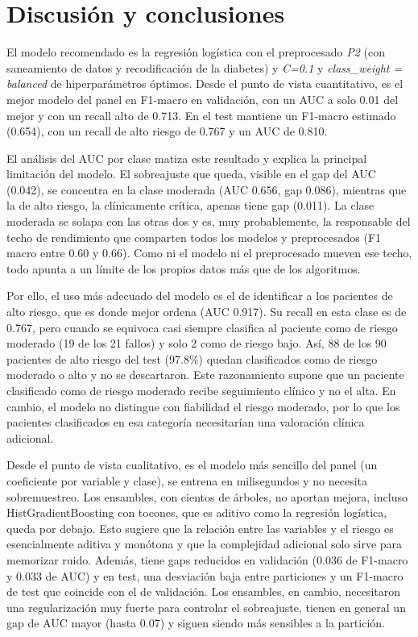 \documentclass[journal,onecolumn]{IEEEtran}
\begin{document}
\section{Discusión y conclusiones}

El modelo recomendado es la regresión logística con el preprocesado \textit{P2} (con saneamiento de datos y recodificación de la diabetes) y \textit{C=0.1} y \textit{class\_weight = balanced} de hiperparámetros óptimos. Desde el punto de vista cuantitativo, es el mejor modelo del panel en F1-macro en validación, con un AUC a solo 0.01 del mejor y con un recall alto de 0.713. En el test mantiene un F1-macro estimado (0.654), con un recall de alto riesgo de 0.767 y un AUC de 0.810.

El análisis del AUC por clase matiza este resultado y explica la principal limitación del modelo. El sobreajuste que queda, visible en el gap del AUC (0.042), se concentra en la clase moderada (AUC 0.656, gap 0.086), mientras que la de alto riesgo, la clínicamente crítica, apenas tiene gap (0.011). La clase moderada se solapa con las otras dos y es, muy probablemente, la responsable del techo de rendimiento que comparten todos los modelos y preprocesados (F1 macro entre 0.60 y 0.66). Como ni el modelo ni el preprocesado mueven ese techo, todo apunta a un límite de los propios datos más que de los algoritmos.

Por ello, el uso más adecuado del modelo es el de identificar a los pacientes de alto riesgo, que es donde mejor ordena (AUC 0.917). Su recall en esta clase es de 0.767, pero cuando se equivoca casi siempre clasifica al paciente como de riesgo moderado (19 de los 21 fallos) y solo 2 como de riesgo bajo. Así, 88 de los 90 pacientes de alto riesgo del test (97.8\%) quedan clasificados como de riesgo moderado o alto y no se descartaron. Este razonamiento supone que un paciente clasificado como de riesgo moderado recibe seguimiento clínico y no el alta. En cambio, el modelo no distingue con fiabilidad el riesgo moderado, por lo que los pacientes clasificados en esa categoría necesitarían una valoración clínica adicional.

Desde el punto de vista cualitativo, es el modelo más sencillo del panel (un coeficiente por variable y clase), se entrena en milisegundos y no necesita sobremuestreo. Los ensambles, con cientos de árboles, no aportan mejora, incluso HistGradientBoosting con tocones, que es aditivo como la regresión logística, queda por debajo. Esto sugiere que la relación entre las variables y el riesgo es esencialmente aditiva y monótona y que la complejidad adicional solo sirve para memorizar ruido. Además, tiene gaps reducidos en validación (0.036 de F1-macro y 0.033 de AUC) y en test, una desviación baja entre particiones y un F1-macro de test que coincide con el de validación. Los ensambles, en cambio, necesitaron una regularización muy fuerte para controlar el sobreajuste, tienen en general un gap de AUC mayor (hasta 0.07) y siguen siendo más sensibles a la partición.
\end{document}
